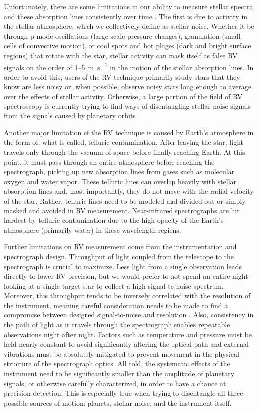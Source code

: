 Unfortunately, there are some limitations in our ability to measure stellar spectra and these absorption lines consistently over time \citep{lovis_radial_2011}. The first is due to activity in the stellar atmosphere, which we collectively define as stellar noise. Whether it be through p-mode oscillations (large-scale pressure changes), granulation (small cells of convective motion), or cool spots and hot plages (dark and bright surface regions) that rotate with the star, stellar activity can mask itself as false RV signals on the order of 1--5~\si{\meter\per\second} in the motion of the stellar absorption lines. In order to avoid this, users of the RV technique primarily study stars that they know are less noisy or, when possible, observe noisy stars long enough to average over the effects of stellar activity. Otherwise, a large portion of the field of RV spectroscopy is currently trying to find ways of disentangling stellar noise signals from the signals caused by planetary orbits \citep[e.g.][]{davis_insights_2017, dumusque_measuring_2018}.

Another major limitation of the RV technique is caused by Earth's atmosphere in the form of, what is called, telluric contamination. After leaving the star, light travels only through the vacuum of space before finally reaching Earth. At this point, it must pass through an entire atmosphere before reaching the spectrograph, picking up new absorption lines from gases such as molecular oxygen and water vapor. These telluric lines can overlap heavily with stellar absorption lines and, most importantly, they do not move with the radial velocity of the star. Rather, telluric lines need to be modeled and divided out or simply masked and avoided in RV measurement. Near-infrared spectrographs are hit hardest by telluric contamination due to the high opacity of the Earth's atmosphere (primarily water) in these wavelength regions.

Further limitations on RV measurement come from the instrumentation and spectrograph design. Throughput of light coupled from the telescope to the spectrograph is crucial to maximize. Less light from a single observation leads directly to lower RV precision, but we would prefer to not spend an entire night looking at a single target star to collect a high signal-to-noise spectrum. Moreover, this throughput tends to be inversely correlated with the resolution of the instrument, meaning careful consideration needs to be made to find a compromise between designed signal-to-noise and resolution \citep{davis_insights_2017}. Also, consistency in the path of light as it travels through the spectrograph enables repeatable observations night after night. Factors such as temperature and pressure must be held nearly constant to avoid significantly altering the optical path and external vibrations must be absolutely mitigated to prevent movement in the physical structure of the spectrograph optics. All told, the systematic effects of the instrument need to be significantly smaller than the amplitude of planetary signals, or otherwise carefully characterized, in order to have a chance at precision detection. This is especially true when trying to disentangle all three possible sources of motion: planets, stellar noise, and the instrument itself.

